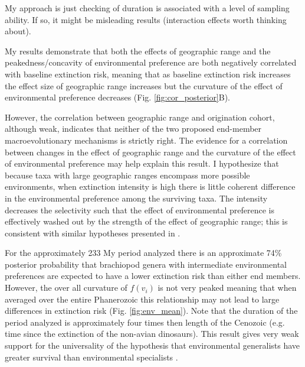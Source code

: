 \documentclass{article}
\begin{document}
My approach is just checking of duration is associated with a level of sampling ability. If so, it might be misleading results (interaction effects worth thinking about).



My results demonstrate that both the effects of geographic range and the peakedness/concavity of environmental preference are both negatively correlated with baseline extinction risk, meaning that as baseline extinction risk increases the effect size of geographic range increases but the curvature of the effect of environmental preference decreases (Fig. \ref{fig:cor_posterior}B). 

However, the correlation between geographic range and origination cohort, although weak, indicates that neither of the two proposed end-member macroevolutionary mechanisms is strictly right. The evidence for a correlation between changes in the effect of geographic range and the curvature of the effect of environmental preference may help explain this result. I hypothesize that because taxa with large geographic ranges encompass more possible environments, when extinction intensity is high there is little coherent difference in the environmental preference among the surviving taxa. The intensity decreases the selectivity such that the effect of environmental preference is effectively washed out by the strength of the effect of geographic range; this is consistent with similar hypotheses presented in \citet{Raup1991b}. 

For the approximately 233 My period analyzed there is an approximate 74\% posterior probability that brachiopod genera with intermediate environmental preferences are expected to have a lower extinction risk than either end members. However, the over all curvature of \(f(v_{i})\) is not very peaked meaning that when averaged over the entire Phanerozoic this relationship may not lead to large differences in extinction risk (Fig. \ref{fig:env_mean}). Note that the duration of the period analyzed is approximately four times then length of the Cenozoic (e.g. time since the extinction of the non-avian dinosaurs). This result gives very weak support for the universality of the hypothesis that environmental generalists have greater survival than environmental specialists \citep{Simpson1944,Liow2004a,Liow2007b,Nurnberg2013a,Nurnberg2015}.
\end{document}
